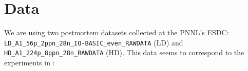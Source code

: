 

\section*{Data}
We are using two postmortem datasets collected at the PNNL's ESDC:
\verb=LD_A1_56p_2ppn_28n_IO-BASIC_even_RAWDATA= (LD) and \verb=HD_A1_224p_8ppn_28n_RAWDATA= (HD).
This data seems to correspond to the experiments in \cite{Karavanic2011}: 

